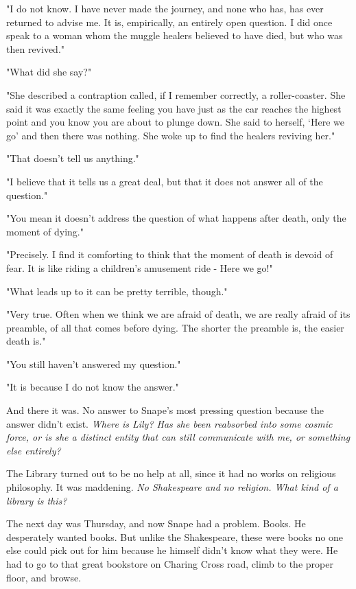 "I do not know. I have never made the journey, and none who has, has ever returned to advise me. It is, empirically, an entirely open question. I did once speak to a woman whom the muggle healers believed to have died, but who was then revived."

"What did she say?"

"She described a contraption called, if I remember correctly, a roller-coaster. She said it was exactly the same feeling you have just as the car reaches the highest point and you know you are about to plunge down. She said to herself, `Here we go{\el}' and then there was nothing. She woke up to find the healers reviving her."

"That doesn't tell us anything."

"I believe that it tells us a great deal, but that it does not answer all of the question."

"You mean it doesn't address the question of what happens after death, only the moment of dying."

"Precisely. I find it comforting to think that the moment of death is devoid of fear. It is like riding a children's amusement ride - Here we go!"

"What leads up to it can be pretty terrible, though."

"Very true. Often when we think we are afraid of death, we are really afraid of its preamble, of all that comes before dying. The shorter the preamble is, the easier death is."

"You still haven't answered my question."

"It is because I do not know the answer."

And there it was. No answer to Snape's most pressing question because the answer didn't exist. \emph{Where is Lily? Has she been reabsorbed into some cosmic force, or is she a distinct entity that can still communicate with me, or something else entirely?}

The Library turned out to be no help at all, since it had no works on religious philosophy. It was maddening. \emph{No Shakespeare and no religion. What kind of a library is this?}

The next day was Thursday, and now Snape had a problem. Books. He desperately wanted books. But unlike the Shakespeare, these were books no one else could pick out for him because he himself didn't know what they were. He had to go to that great bookstore on Charing Cross road, climb to the proper floor, and browse.

